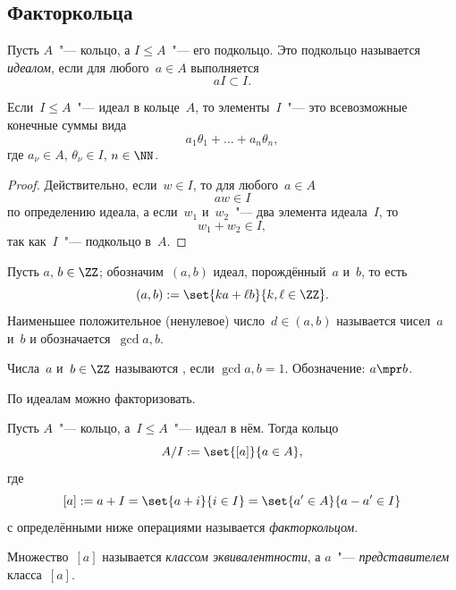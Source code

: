 \subsection{Факторкольца}

\begin{definition}
	Пусть $A$~"--- кольцо, а $I \leq A$~"--- его подкольцо. Это подкольцо называется \emph{идеалом}, если для любого~$a \in A$ выполняется
	\[
		aI \subset I
		.
	\]
\end{definition}

\begin{proposition}
	Если~$I \leq A$~"--- идеал в кольце~$A$, то элементы~$I$~"--- это всевозможные конечные суммы вида
	\[
		a_1 \theta_1 + \dots + a_n \theta_n,
	\]
	где $a_\nu \in A$, $\theta_\nu \in I$, $n \in \NN$.
\end{proposition}
\begin{proof}
	Действительно, если~$w \in I$, то для любого~$a \in A$
	\[
		aw \in I
	\]
	по определению идеала,
	а если~$w_1$ и~$w_2$~"--- два элемента идеала~$I$, то
	\[
		w_1 + w_2 \in I,
	\]
	так как~$I$~"--- подкольцо в~$A$.
\end{proof}

\begin{definition}
	Пусть $a$, $b \in \ZZ$; обозначим~$(a, b)$ идеал, порождённый~$a$ и~$b$, то есть
	\[
		(a, b) :=
		\set{ka + \ell b}{k, \ell \in \ZZ}
		.
	\]
	Наименьшее положительное (ненулевое) число~$d \in (a, b)$ называется  чисел~$a$ и~$b$ и обозначается~$\gcd{a, b}$.
\end{definition}

% 	



\begin{definition}
	Числа~$a$ и~$b \in \ZZ$ называются , если $\gcd{a, b} = 1$. Обозначение: $a \mpr b$.
\end{definition}

По идеалам можно факторизовать.

\begin{definition}
	Пусть $A$~"--- кольцо, а~$I \leq A$~"--- идеал в нём. Тогда кольцо
	\[
		A/I :=
		\set{[a]}{a \in A},
	\]
	где
	\[
		[a] := a + I =
		\set{a + i}{i \in I} =
		\set{a' \in A}{a - a' \in I}
	\]
	с определёнными ниже операциями называется \emph{факторкольцом}.

	Множество~$[a]$ называется \emph{классом эквивалентности}, а $a$~"--- \emph{представителем} класса~$[a]$.
\end{definition}

